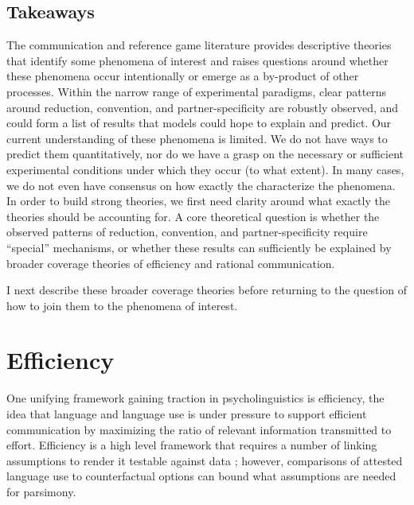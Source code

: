 \documentclass[]{article}
\begin{document}
\subsection{Takeaways} 

The communication and reference game literature provides descriptive theories that identify some phenomena of interest and raises questions around whether these phenomena occur intentionally or emerge as a by-product of other processes. Within the narrow range of experimental paradigms, clear patterns around reduction, convention, and partner-specificity are robustly observed, and could form a list of results that models could hope to explain and predict. Our current understanding of these phenomena is limited. We do not have ways to predict them quantitatively, nor do we have a grasp on the necessary or sufficient experimental conditions under which they occur (to what extent). In many cases, we do not even have consensus on how exactly the characterize the phenomena. In order to build strong theories, we first need clarity around what exactly the theories should be accounting for. A core theoretical question is whether the observed patterns of reduction, convention, and partner-specificity require ``special'' mechanisms, or whether these results can sufficiently be explained by broader coverage theories of efficiency and rational communication. 

I next describe these broader coverage theories before returning to the question of how to join them to the phenomena of interest. 




\section{Efficiency}

One unifying framework gaining traction in psycholinguistics is efficiency, the idea that language and language use is under pressure to support efficient communication by maximizing the ratio of relevant information transmitted to effort. Efficiency is a high level framework that requires a number of linking assumptions to render it testable against data ; however, comparisons of attested language use to counterfactual options can bound what assumptions are needed for parsimony. 
\end{document}
